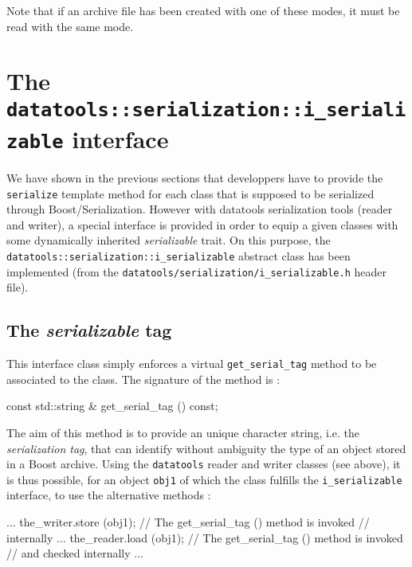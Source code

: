 \documentclass[a4paper,12pt]{article}
\newcommand{\pn}{\par\noindent}
\begin{document}
\pn Note that if an archive file has been created with one of these modes,
it must be read with the same mode.

\clearpage
\section{The \texttt{datatools::serialization::i\_serializable} interface}

\pn We  have shown in the  previous sections that  developpers have to
provide the \texttt{serialize} template  method for each class that is
supposed  to be serialized  through Boost/Serialization.  However with
datatools serialization tools (reader and writer), a special interface
is provided  in order to equip  a given classes  with some dynamically
inherited   \emph{serializable}   trait.    On   this   purpose,   the
\texttt{datatools::serialization::i\_serializable}  abstract class has
been                implemented                (from               the
\texttt{datatools/serialization/i\_serializable.h} header file).

\subsection{The \emph{serializable} tag}

\pn    This    interface    class    simply   enforces    a    virtual
\texttt{get\_serial\_tag} method  to be  associated to the  class. The
signature of the method is :

\begin{CppVerbatim}
const std::string & get_serial_tag () const;
\end{CppVerbatim}

\pn The aim  of this method is to provide  an unique character string,
i.e. the \emph{serialization tag}, that can identify without ambiguity
the  type  of  an  object   stored  in  a  Boost  archive.  Using  the
\texttt{datatools} reader  and writer classes (see above),  it is thus
possible, for an object \texttt{obj1}  of which the class fulfills the
\texttt{i\_serializable} interface, to use the alternative methods :
\begin{CppVerbatim}
  ...
  the_writer.store (obj1); // The get_serial_tag () method is invoked 
                           // internally
  ...
  the_reader.load (obj1);  // The get_serial_tag () method is invoked 
                           // and checked internally
  ...
\end{CppVerbatim}
\end{document}
